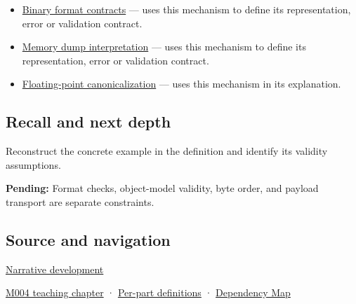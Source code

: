 \begin{itemize}
\item
  \hyperref[appendix-590bbb2424c1]{Binary format contracts} --- uses this mechanism to define its representation, error or validation contract.
\item
  \hyperref[appendix-230b59c0676b]{Memory dump interpretation} --- uses this mechanism to define its representation, error or validation contract.
\item
  \hyperref[appendix-e90053a4b201]{Floating-point canonicalization} --- uses this mechanism in its explanation.
\end{itemize}

\subsection{Recall and next depth}\label{appendix-34ee45f161c1-recall-and-next-depth}

Reconstruct the concrete example in the definition and identify its validity assumptions.

\textbf{Pending:} Format checks, object-model validity, byte order, and payload transport are separate constraints.

\subsection{Source and navigation}\label{appendix-34ee45f161c1-source-and-navigation}

\hyperref[01-foundations-i-ch002-bytes-become-a-durable-agreement]{Narrative development}

\hyperref[01-foundations-i-ch001-a-stretching-ruler-for-real-valued-quantities]{M004 teaching chapter} · \hyperref[appendix-fd090d982a15-m004---parts-61-76]{Per-part definitions} · \hyperref[appendix-4ad47bdd269a]{Dependency Map}
